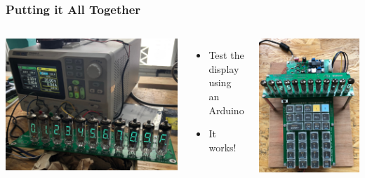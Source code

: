 \documentclass{beamer}
\begin{document}
\begin{frame}
  \frametitle{Putting it All Together}


  \begin{columns}
    \includegraphics[width=\textwidth]{figs/display_11.jpg}
    \begin{itemize}
    \scriptsize
    \item Test the display using an Arduino
    \item It works!
    \end{itemize}
    \includegraphics[width=\textwidth]{figs/top_with_ps.jpg} \\
  \end{columns}
\end{frame}
\end{document}
